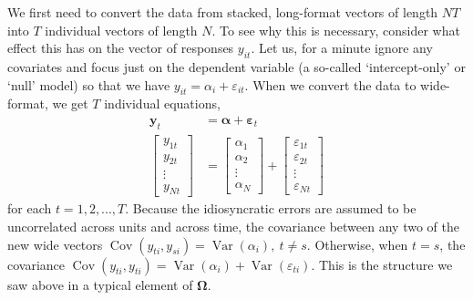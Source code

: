 \documentclass[]{interact}
\theoremstyle{plain}%
\theoremstyle{definition}
\theoremstyle{remark}
\begin{document}
We first need to convert the data from stacked, long-format vectors of
length \(NT\) into \(T\) individual vectors of length \(N\). To see why
this is necessary, consider what effect this has on the vector of
responses \(y_{it}\). Let us, for a minute ignore any covariates and
focus just on the dependent variable (a so-called `intercept-only' or
`null' model) so that we have
\(y_{it} = \alpha_{i} + \varepsilon_{it}\). When we convert the data to
wide-format, we get \(T\) individual equations, \begin{align}
\bm{y}_{t} & = \bm{\alpha} + \bm{\varepsilon}_{t} \\
\begin{bmatrix}
y_{1t} \\
y_{2t} \\
\vdots \\
y_{Nt}\end{bmatrix} & = 
\begin{bmatrix}
\alpha_{1} \\
\alpha_{2} \\
\vdots \\
\alpha_{N}
\end{bmatrix} + 
\begin{bmatrix}
\varepsilon_{1t} \\
\varepsilon_{2t} \\
\vdots \\
\varepsilon_{Nt}
\end{bmatrix} \label{eq:wide}
\end{align} for each \(t = 1, 2, ..., T\). Because the idiosyncratic
errors are assumed to be uncorrelated across units and across time, the
covariance between any two of the new wide vectors
\(\mathop{\mathrm{\mathrm{Cov}}}(y_{ti},y_{si}) = \mathop{\mathrm{\mathrm{Var}}}(\alpha_{i}), \ t \ne s\).
Otherwise, when \(t = s\), the covariance
\(\mathop{\mathrm{\mathrm{Cov}}}(y_{ti},y_{ti}) = \mathop{\mathrm{\mathrm{Var}}}(\alpha_{i}) + \mathop{\mathrm{\mathrm{Var}}}(\varepsilon_{ti})\).
This is the structure we saw above in a typical element of
\(\bm{\Omega}\).
\end{document}
